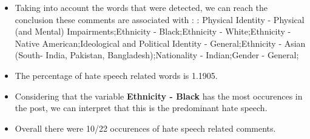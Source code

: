 \documentclass[11pt]{article}
\begin{document}
\begin{itemize}\item Taking into account the words that were detected, we can reach the conclusion these comments are associated with : : Physical Identity - Physical (and Mental) Impairments;Ethnicity - Black;Ethnicity - White;Ethnicity - Native American;Ideological and Political Identity - General;Ethnicity - Asian (South- India, Pakistan, Bangladesh);Nationality - Indian;Gender - General;%

\item The percentage of hate speech related words is 1.1905.

\item Considering that the variable \textbf{Ethnicity - Black} has the most occurences in the post, we can interpret that this is the predominant hate speech.

\item Overall there were 10/22 occurences of hate speech related comments.\end{itemize}
\end{document}

